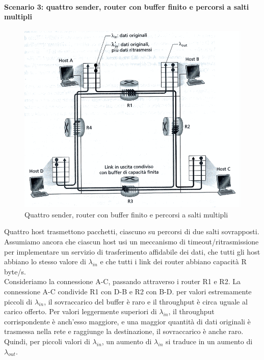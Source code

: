 \documentclass[11pt,a4paper]{article}
\begin{document}
\paragraph{Scenario 3: quattro sender, router con buffer finito e percorsi a salti multipli}
\begin{figure}
	\includegraphics[scale=0.6]{img/043.png}
	\caption{Quattro sender, router con buffer finito e percorsi a salti multipli}
\end{figure}
Quattro host trasmettono pacchetti, ciascuno su percorsi di due salti sovrapposti. Assumiamo ancora che ciascun host usi un meccanismo di timeout/ritrasmissione per implementare un servizio di trasferimento affidabile dei dati, che tutti gli host abbiano lo stesso valore di $\lambda_{in}$ e che tutti i link dei router abbiano capacità R byte/s. \\
Consideriamo la connessione A-C, passando attraverso i router R1 e R2. La connessione A-C condivide R1 con D-B e R2 con B-D. per valori estremamente piccoli di $\lambda_{in}$, il sovraccarico del buffer è raro e il throughput è circa uguale al carico offerto. Per valori leggermente superiori di $\lambda_{in}$, il throughput corrispondente è anch'esso maggiore, e una maggior quantità di dati originali è trasmessa nella rete e raggiunge la destinazione, il sovraccarico è anche raro. Quindi, per piccoli valori di $\lambda_{in}$, un aumento di $\lambda_{in}$ si traduce in un aumento di $\lambda_{out}$. \\
\end{document}
